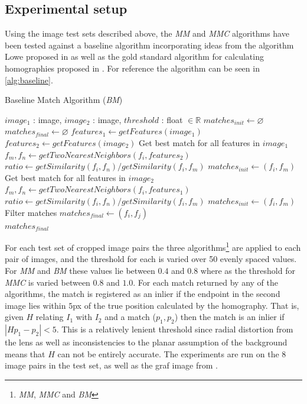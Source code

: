 \documentclass{article}
\begin{document}
\subsection{Experimental setup}

Using the image test sets described above, the \emph{MM} and \emph{MMC} 
algorithms have been tested against a baseline algorithm incorporating 
ideas from the algorithm Lowe proposed in \cite{lowe2004sift} as well as 
the gold standard algorithm for calculating homographies proposed in 
\cite{multipleView}. For reference the algorithm can be seen in 
\ref{alg:baseline}.

\begin{algorithm}
\caption{Baseline Match Algorithm (\emph{BM})}
\label{alg:baseline}
\begin{algorithmic}
\Require $image_1$ : image, $image_2$ : image, $threshold$ : float $\in 
\mathbb{R}$
\State $matches_{init}\gets \varnothing$
\State $matches_{final}\gets \varnothing$
\State $features_1 \gets getFeatures(image_1)$
\State $features_2 \gets getFeatures(image_2)$
 \Comment Get best match for all features 
in $image_1$
	\State $f_m,f_n \gets getTwoNearestNeighbors(f_i, features_2)$
	\State $ratio \gets getSimilarity(f_i, f_n) / getSimilarity(f_i, 
	f_m)$
		\State $matches_{init} \gets \left(f_i, f_m\right)$
	\EndIf
\EndFor
%
 \Comment Get best match for all features 
in $image_2$
	\State $f_m,f_n \gets getTwoNearestNeighbors(f_i, features_1)$
	\State $ratio \gets getSimilarity(f_i, f_n) / getSimilarity(f_i, 
	f_m)$
		\State $matches_{init} \gets \left(f_i, f_m\right)$
	\EndIf
\EndFor
%
 \Comment Filter 
matches
		\State $matches_{final} \gets (f_i, f_j)$
	\EndIf
\EndFor \\
\Return $matches_{final}$
\end{algorithmic}
\end{algorithm}

For each test set of cropped image pairs the three 
algorithms\footnote{\emph{MM}, \emph{MMC} and \emph{BM}} are applied to 
each pair of images, and the threshold for each is varied over 50 evenly 
spaced values. For \emph{MM} and \emph{BM} these values lie between 
$0.4$ and $0.8$ where as the threshold for \emph{MMC} is varied between 
$0.8$ and $1.0$. For each match returned by any of the algorithms, the 
match is registered as an inlier if the endpoint in the second image 
lies within $5$px of the true position calculated by the homography.  
That is, given $H$ relating $I_1$ with $I_2$ and a match ($p_1, p_2$) 
then the match is an inlier if $\left\vert Hp_1 - p_2 \right\vert < 5$.  
This is a relatively lenient threshold since radial distortion from the 
lens as well as inconsistencies to the planar assumption of the 
background means that $H$ can not be entirely accurate. The experiments 
are run on the $8$ image pairs in the test set, as well as the graf 
image from \cite{mikolajczyk2005performance}.
\end{document}
